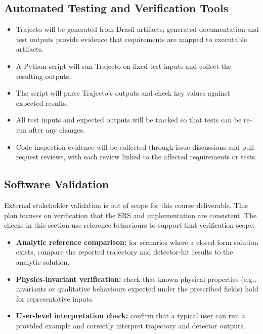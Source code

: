 \documentclass[12pt, titlepage]{article}
\providecommand{\wss}[1]{}
\providecommand{\progname}[1]{#1}
\begin{document}
\wss{In this section you would also give any details of any plans for static
  verification of the implementation.  Potential techniques include code
  walkthroughs, code inspection, static analyzers, etc.}

\wss{The final class presentation in CAS 741 could be used as a code
walkthrough.  There is also a possibility of using the final presentation (in
CAS741) for a partial usability survey.}

\subsection{Automated Testing and Verification Tools}

\begin{itemize}
  \item \progname{Trajecto} will be generated from Drasil artifacts; generated
  documentation and test outputs provide evidence that requirements are mapped
  to executable artifacts.
  \item A Python script will run \progname{Trajecto} on fixed test inputs and
  collect the resulting outputs.
  \item The script will parse \progname{Trajecto}'s outputs and check key
  values against expected results.
  \item All test inputs and expected outputs will be tracked so that tests can
  be re-run after any changes.
  \item Code inspection evidence will be collected through issue discussions and
  pull-request reviews, with each review linked to the affected requirements or
  tests.
\end{itemize}

\subsection{Software Validation}

External stakeholder validation is out of scope for this course deliverable.
This plan focuses on verification that the SRS and implementation are
consistent. The checks in this section use reference behaviours to support that
verification scope:
\begin{itemize}
  \item \textbf{Analytic reference comparison:} for scenarios where a closed-form solution
  exists, compare the reported trajectory and detector-hit results to the
  analytic solution.
  \item \textbf{Physics-invariant verification:} check that known physical properties
  (e.g., invariants or qualitative behaviours expected under the prescribed
  fields) hold for representative inputs.
  \item \textbf{User-level interpretation check:} confirm that a typical user
  can run a provided example and correctly interpret trajectory and detector
  outputs.
\end{itemize}
\end{document}
